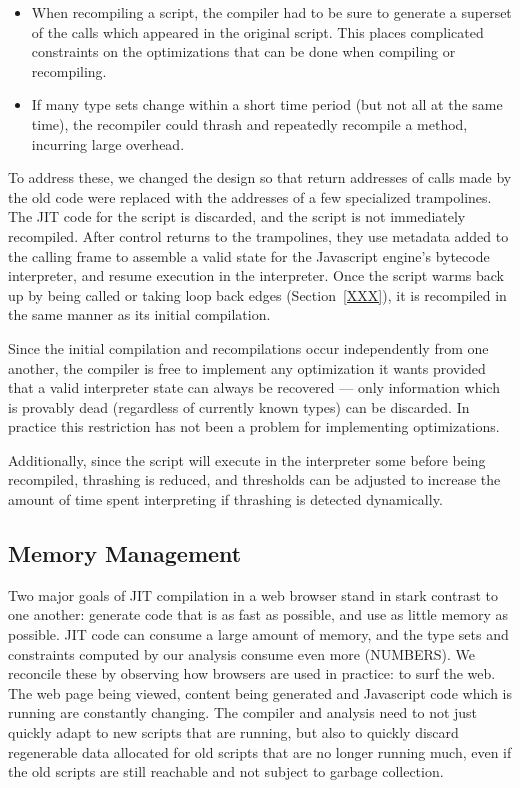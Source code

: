 \begin{itemize}

\item When recompiling a script, the compiler had to be sure to generate
a superset of the calls which appeared in the original script.
This places complicated constraints on the optimizations that
can be done when compiling or recompiling.

\item If many type sets change within a short time period (but not all at
the same time), the recompiler could thrash and repeatedly recompile a
method, incurring large overhead.

\end{itemize}

To address these, we changed the design so that return addresses of
calls made by the old code were replaced with the addresses of
a few specialized trampolines.
The JIT code for the script is discarded, and the script is not
immediately recompiled.
After control returns to the trampolines, they use metadata added to
the calling frame to assemble
a valid state for the Javascript engine's bytecode interpreter,
and resume execution in the interpreter.
Once the script warms back up by being called or taking loop back edges
(Section~\ref{XXX}), it is recompiled in the same manner as its
initial compilation.

Since the initial compilation and recompilations occur independently
from one another, the compiler is free to implement any optimization it
wants provided that a valid interpreter state can always be recovered ---
only information which is provably dead (regardless of currently known types)
can be discarded.
In practice this restriction has not been a problem for
implementing optimizations.

Additionally, since the script will execute in the interpreter some before
being recompiled, thrashing is reduced, and thresholds can be adjusted to
increase the amount of time spent interpreting if thrashing is detected
dynamically.

\subsection{Memory Management}

Two major goals of JIT compilation in a web browser stand in stark contrast
to one another: generate code that is as fast as possible, and use as little
memory as possible.
JIT code can consume a large amount of memory, and the type sets and constraints
computed by our analysis consume even more (NUMBERS).
We reconcile these by observing how browsers are used in practice:
to surf the web.
The web page being viewed, content being generated and Javascript code which
is running are constantly changing.
The compiler and analysis need to not just quickly adapt to new scripts that are
running, but also to quickly discard regenerable data allocated for
old scripts that are no longer running much, even if the old scripts are still
reachable and not subject to garbage collection.

